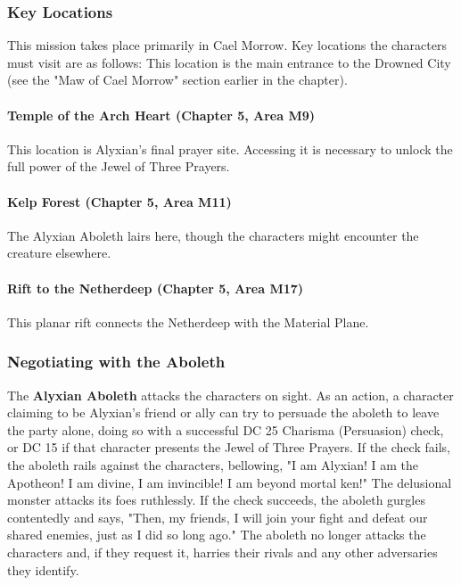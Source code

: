 \documentclass[10pt,a4,twoside,twocolumn,openany,nodeprecatedcode]{dndbook}
\begin{document}
\subsubsection{Key Locations}
This mission takes place primarily in Cael Morrow. Key locations the characters must visit are as follows:
{{This location is the main entrance to the Drowned City (see the "Maw of Cael Morrow" section earlier in the chapter).}}
\paragraph{Temple of the Arch Heart (Chapter 5, Area M9)}
This location is Alyxian's final prayer site. Accessing it is necessary to unlock the full power of the Jewel of Three Prayers.
\paragraph{Kelp Forest (Chapter 5, Area M11)}
The Alyxian Aboleth lairs here, though the characters might encounter the creature elsewhere.
\paragraph{Rift to the Netherdeep (Chapter 5, Area M17)}
This planar rift connects the Netherdeep with the Material Plane.
\subsubsection{Negotiating with the Aboleth}
The \textbf{Alyxian Aboleth} attacks the characters on sight. As an action, a character claiming to be Alyxian's friend or ally can try to persuade the aboleth to leave the party alone, doing so with a successful DC 25 Charisma (Persuasion) check, or DC 15 if that character presents the Jewel of Three Prayers.
If the check fails, the aboleth rails against the characters, bellowing, "I am Alyxian! I am the Apotheon! I am divine, I am invincible! I am beyond mortal ken!" The delusional monster attacks its foes ruthlessly.
If the check succeeds, the aboleth gurgles contentedly and says, "Then, my friends, I will join your fight and defeat our shared enemies, just as I did so long ago." The aboleth no longer attacks the characters and, if they request it, harries their rivals and any other adversaries they identify.
\end{document}
